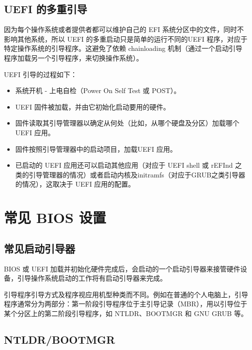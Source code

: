 \documentclass[doctor,openright,twoside]{sjtuthesis}
\providecommand{\tightlist}{%
    \setlength{\itemsep}{0pt}\setlength{\parskip}{0pt}}
\theoremstyle{plain}
\theoremstyle{definition}
\theoremstyle{remark}
\theoremstyle{ocrenumbox}
\theoremstyle{plain}
\begin{document}
\hypertarget{uefi--1}{%
\subsection{UEFI 的多重引导}\label{uefi--1}}

因为每个操作系统或者提供者都可以维护自己的 EFI 系统分区中的文件，同时不影响其他系统，所以 UEFI 的多重启动只是简单的运行不同的UEFI 程序，对应于特定操作系统的引导程序。这避免了依赖 chainloading 机制（通过一个启动引导程序加载另一个引导程序，来切换操作系统）。

UEFI 引导的过程如下：

\begin{itemize}
\tightlist
\item
  系统开机 - 上电自检（Power On Self Test 或 POST）。
\item
  UEFI 固件被加载，并由它初始化启动要用的硬件。
\item
  固件读取其引导管理器以确定从何处（比如，从哪个硬盘及分区）加载哪个 UEFI 应用。
\item
  固件按照引导管理器中的启动项目，加载UEFI 应用。
\item
  已启动的 UEFI 应用还可以启动其他应用（对应于 UEFI shell 或 rEFInd 之类的引导管理器的情况）或者启动内核及initramfs（对应于GRUB之类引导器的情况），这取决于 UEFI 应用的配置。
\end{itemize}

\hypertarget{bios--1}{%
\section{常见 BIOS 设置}\label{bios--1}}

\hypertarget{section-161}{%
\subsection{常见启动引导器}\label{section-161}}

BIOS 或 UEFI 加载并初始化硬件完成后，会启动的一个启动引导器来接管硬件设备，引导操作系统启动的工作将有启动引导器来完成。

引导程序引导方式及程序视应用机型种类而不同。例如在普通的个人电脑上，引导程序通常分为两部分：第一阶段引导程序位于主引导记录（MBR），用以引导位于某个分区上的第二阶段引导程序，如 NTLDR、BOOTMGR 和 GNU GRUB 等。

\hypertarget{ntldrbootmgr}{%
\subsection{NTLDR/BOOTMGR}\label{ntldrbootmgr}}
\end{document}

